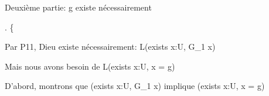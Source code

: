 \documentclass[10pt]{report}
\begin{document}
\begin{coqdoccode}
\begin{coqdoccomment}
\coqdocindent{0.50em}
Deuxième\coqdocindent{0.50em}
partie:\coqdocindent{0.50em}
g\coqdocindent{0.50em}
existe\coqdocindent{0.50em}
nécessairement\coqdocindent{0.50em}
\end{coqdoccomment}
\coqdoceol
\coqdocindent{1.00em}
.\coqdoceol
\coqdocindent{1.00em}
\{\coqdoceol
\coqdocindent{2.00em}
\begin{coqdoccomment}
\coqdocindent{0.50em}
Par\coqdocindent{0.50em}
P11,\coqdocindent{0.50em}
Dieu\coqdocindent{0.50em}
existe\coqdocindent{0.50em}
nécessairement:\coqdocindent{0.50em}
L(exists\coqdocindent{0.50em}
x:U,\coqdocindent{0.50em}
G\_1\coqdocindent{0.50em}
x)\coqdocindent{0.50em}
\end{coqdoccomment}
\coqdoceol
\coqdocindent{2.00em}
\begin{coqdoccomment}
\coqdocindent{0.50em}
Mais\coqdocindent{0.50em}
nous\coqdocindent{0.50em}
avons\coqdocindent{0.50em}
besoin\coqdocindent{0.50em}
de\coqdocindent{0.50em}
L(exists\coqdocindent{0.50em}
x:U,\coqdocindent{0.50em}
x\coqdocindent{0.50em}
=\coqdocindent{0.50em}
g)\coqdocindent{0.50em}
\end{coqdoccomment}
\coqdoceol
\coqdocindent{2.00em}
\coqdoceol
\coqdocindent{2.00em}
\begin{coqdoccomment}
\coqdocindent{0.50em}
D'abord,\coqdocindent{0.50em}
montrons\coqdocindent{0.50em}
que\coqdocindent{0.50em}
(exists\coqdocindent{0.50em}
x:U,\coqdocindent{0.50em}
G\_1\coqdocindent{0.50em}
x)\coqdocindent{0.50em}
implique\coqdocindent{0.50em}
(exists\coqdocindent{0.50em}
x:U,\coqdocindent{0.50em}
x\coqdocindent{0.50em}
=\coqdocindent{0.50em}
g)\coqdocindent{0.50em}
\end{coqdoccomment}
\coqdoceol
\coqdocindent{2.00em}

\end{coqdoccode}
\end{document}

